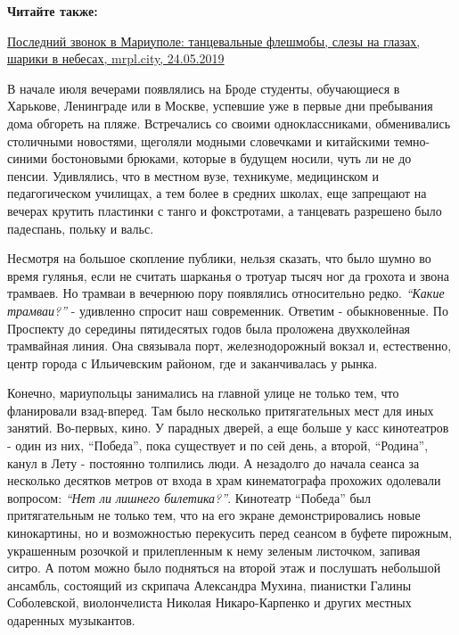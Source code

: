 \textbf{Читайте также:}

\href{https://mrpl.city/news/view/poslednij-zvonok-v-mariupole-tantsevalnye-fleshmoby-slezy-na-glazah-shariki-v-nebesah-foto-plusvideo}{%
Последний звонок в Мариуполе: танцевальные флешмобы, слезы на глазах, шарики в небесах, mrpl.city, 24.05.2019}

В начале июля вечерами появлялись на Броде студенты, обучающиеся в Харькове,
Ленинграде или в Москве, успевшие уже в первые дни пребывания дома обгореть на
пляже. Встречались со своими одноклассниками, обменивались столичными
новостями, щеголяли модными словечками и китайскими темно-синими бостоновыми
брюками, которые в будущем носили, чуть ли не до пенсии. Удивлялись, что в
местном вузе, техникуме, медицинском и педагогическом училищах, а тем более в
средних школах, еще запрещают на вечерах крутить пластинки с танго и
фокстротами, а танцевать разрешено было падеспань, польку и вальс.

Несмотря на большое скопление публики, нельзя сказать, что было шумно во время
гулянья, если не считать шарканья о тротуар тысяч ног да грохота и звона
трамваев. Но трамваи в вечернюю пору появлялись относительно редко. \emph{\enquote{Какие
трамваи?}} - удивленно спросит наш современник. Ответим - обыкновенные. По
Проспекту до середины пятидесятых годов была проложена двухколейная трамвайная
линия. Она связывала порт, железнодорожный вокзал и, естественно, центр города
с Ильичевским районом, где и заканчивалась у рынка.

Конечно, мариупольцы занимались на главной улице не только тем, что фланировали
взад-вперед. Там было несколько притягательных мест для иных занятий.
Во-первых, кино. У парадных дверей, а еще больше у касс кинотеатров - один из
них, \enquote{Победа}, пока существует и по сей день, а второй, \enquote{Родина}, канул в Лету
- постоянно толпились люди. А незадолго до начала сеанса за несколько десятков
метров от входа в храм кинематографа прохожих одолевали вопросом: \emph{\enquote{Нет ли
лишнего билетика?}}. Кинотеатр \enquote{Победа} был притягательным не только тем, что на
его экране демонстрировались новые кинокартины, но и возможностью перекусить
перед сеансом в буфете пирожным, украшенным розочкой и прилепленным к нему
зеленым листочком, запивая ситро. А потом можно было подняться на второй этаж и
послушать небольшой ансамбль, состоящий из скрипача Александра Мухина,
пианистки Галины Соболевской, виолончелиста Николая Никаро-Карпенко и других
местных одаренных музыкантов.

